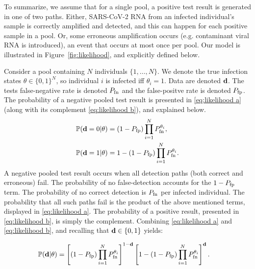\documentclass{article}
\begin{document}
To summarize, we assume that for a single pool, a positive test result
is generated in one of two paths. Either, SARS-CoV-2 RNA from an
infected individual's sample is correctly amplified and detected, and
this can happen for each positive sample in a pool. Or, some erroneous
amplification occurs (e.g. contaminant viral RNA is introduced), an
event that occurs at most once per pool. Our model is illustrated in
Figure~\ref{fig:likelihood}, and explicitly defined below. 

Consider a pool containing $N$ individuals $\{1,\dots,N\}$. We denote
the true infection states $\theta \in \{0,1\}^N$, so individual $i$ is
infected iff $\theta_i=1$. Data are denoted $\mathbf{d}$. The tests
false-negative rate is denoted $P_{\text{fn}}$ and the false-positve rate is
denoted $P_{\text{fp}}$. The probability of a negative pooled test result is
presented in \eqref{eq:likelihood a} (along with its complement
\eqref{eq:likelihood b}), and explained below.
\begin{subequations}
\begin{align}%
    \Pr(\data=0 | \theta) &= (1-\fp)\prod_{i=1}^N
    \fn^{\theta_i}, \label{eq:likelihood a}\\
    \Pr(\data=1 | \theta) &= 1 - (1-\fp)\prod_{i=1}^N \fn^{\theta_i}. \label{eq:likelihood b}
\end{align}
\end{subequations}
A negative pooled test result occurs when all detection paths (both
correct and erroneous) fail. The probability of no false-detection
accounts for the $1-P_{\text{fp}}$ term. The probability of no correct detection
is $P_{\text{fn}}$ per infected individual. The probability that all such paths
fail is the product of the above mentioned terms, displayed in
\eqref{eq:likelihood a}. The probability of a positive result,
presented in \eqref{eq:likelihood b}, is simply the complement.
Combining \eqref{eq:likelihood a} and \eqref{eq:likelihood b}, and
recalling that $\mathbf{d} \in \{0,1\}$ yields:

\begin{align}\label{eq:combined likelihood}
  \begin{split}
    \mathbb{P}(\mathbf{d}| \theta) &= \left [(1-P_{\text{fp}})\prod_{i=1}^N
      P_{\text{fn}}^{\theta_i} \right ]^{1-\mathbf{d}} \left [1 - (1-P_{\text{fp}})\prod_{i=1}^N P_{\text{fn}}^{\theta_i} \right ]^{\mathbf{d}}.
  \end{split}
\end{align}
\end{document}
